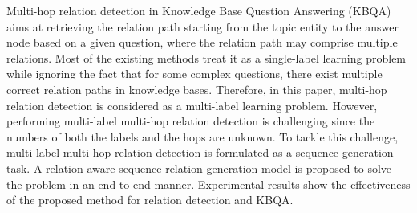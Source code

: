 Multi-hop relation detection in Knowledge Base Question Answering (KBQA) aims at retrieving the relation path starting from the topic entity to the answer node based on a given question, where the relation path may comprise multiple relations. Most of the existing methods treat it as a single-label learning problem while ignoring the fact that for some complex questions, there exist multiple correct relation paths in knowledge bases. Therefore, in this paper, multi-hop relation detection is considered as a multi-label learning problem. However, performing multi-label multi-hop relation detection is challenging since the numbers of both the labels and the hops are unknown. To tackle this challenge, multi-label multi-hop relation detection is formulated as a sequence generation task. A relation-aware sequence relation generation model is proposed to solve the problem in an end-to-end manner. Experimental results show the effectiveness of the proposed method for relation detection and KBQA.
